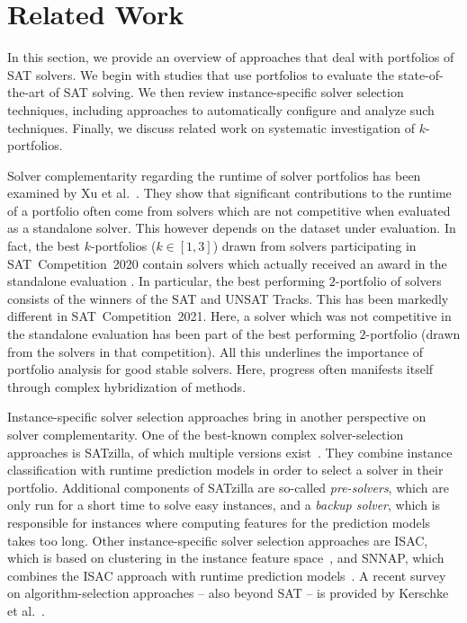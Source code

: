 \documentclass[conference]{IEEEtran}
\begin{document}
\section{Related Work}
\label{sec:related-work}

In this section, we provide an overview of approaches that deal with portfolios of SAT solvers. 
We begin with studies that use portfolios to evaluate the state-of-the-art of SAT solving. 
We then review instance-specific solver selection techniques, including approaches to automatically configure and analyze such techniques. 
Finally, we discuss related work on systematic investigation of $k$-portfolios. 

Solver complementarity regarding the runtime of solver portfolios has been examined by Xu et al.~\cite{Xu:2012:EvalContribVBS}. 
They show that significant contributions to the runtime of a portfolio often come from solvers which are not competitive when evaluated as a standalone solver. 
This however depends on the dataset under evaluation. 
In fact, the best $k$-portfolios ($k \in [1,3]$) drawn from solvers participating in SAT~Competition~2020 contain solvers which actually received an award in the standalone evaluation \cite{SC2020:AIJ}.
In particular, the best performing $2$-portfolio of solvers consists of the winners of the SAT and UNSAT Tracks. 
This has been markedly different in SAT~Competition~2021.
Here, a solver which was not competitive in the standalone evaluation has been part of the best performing $2$-portfolio (drawn from the solvers in that competition). 
All this underlines the importance of portfolio analysis for good stable solvers. Here, progress often manifests itself through complex hybridization of methods. 

Instance-specific solver selection approaches bring in another perspective on solver complementarity.
One of the best-known complex solver-selection approaches is SATzilla, of which multiple versions exist~\cite{xu2008satzilla, xu2012satzilla2012}. 
They combine instance classification with runtime prediction models in order to select a solver in their portfolio. 
Additional components of SATzilla are so-called \emph{pre-solvers}, which are only run for a short time to solve easy instances, and a \emph{backup solver}, which is responsible for instances where computing features for the prediction models takes too long.
Other instance-specific solver selection approaches are ISAC, which is based on clustering in the instance feature space~\cite{Kadioglu:2010:ISAC}, and SNNAP, which combines the ISAC approach with runtime prediction models~\cite{Collautti:2013:SNNAP}.
A recent survey on algorithm-selection approaches -- also beyond SAT -- is provided by Kerschke et al.~\cite{kerschke2019automated}.
\end{document}

